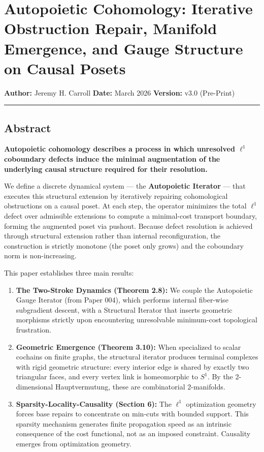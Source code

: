\documentclass[
]{article}
\author{}
\date{}
\begin{document}
\section{Autopoietic Cohomology: Iterative Obstruction Repair, Manifold
Emergence, and Gauge Structure on Causal
Posets}\label{autopoietic-cohomology-iterative-obstruction-repair-manifold-emergence-and-gauge-structure-on-causal-posets}

\textbf{Author:} Jeremy H. Carroll \textbf{Date:} March 2026
\textbf{Version:} v3.0 (Pre-Print)

\begin{center}\rule{0.5\linewidth}{0.5pt}\end{center}

\subsection{Abstract}\label{abstract}

\textbf{Autopoietic cohomology describes a process in which unresolved
\(\ell^1\) coboundary defects induce the minimal augmentation of the
underlying causal structure required for their resolution.}

We define a discrete dynamical system --- the \textbf{Autopoietic
Iterator} --- that executes this structural extension by iteratively
repairing cohomological obstructions on a causal poset. At each step,
the operator minimizes the total \(\ell^1\) defect over admissible
extensions to compute a minimal-cost transport boundary, forming the
augmented poset via pushout. Because defect resolution is achieved
through structural extension rather than internal reconfiguration, the
construction is strictly monotone (the poset only grows) and the
coboundary norm is non-increasing.

This paper establishes three main results:

\begin{enumerate}
\def\labelenumi{\arabic{enumi}.}
\item
  \textbf{The Two-Stroke Dynamics (Theorem 2.8):} We couple the
  Autopoietic Gauge Iterator (from Paper 004), which performs internal
  fiber-wise subgradient descent, with a Structural Iterator that
  inserts geometric morphisms strictly upon encountering unresolvable
  minimum-cost topological frustration.
\item
  \textbf{Geometric Emergence (Theorem 3.10):} When specialized to
  scalar cochains on finite graphs, the structural iterator produces
  terminal complexes with rigid geometric structure: every interior edge
  is shared by exactly two triangular faces, and every vertex link is
  homeomorphic to \(S^1\). By the 2-dimensional Hauptvermutung, these
  are combinatorial 2-manifolds.
\item
  \textbf{Sparsity-Locality-Causality (Section 6):} The \(\ell^1\)
  optimization geometry forces base repairs to concentrate on min-cuts
  with bounded support. This sparsity mechanism generates finite
  propagation speed as an intrinsic consequence of the cost functional,
  not as an imposed constraint. Causality emerges from optimization
  geometry.
\end{enumerate}
\end{document}

